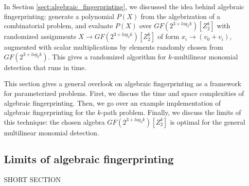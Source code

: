 In Section \ref{sect:algebraic_fingerprinting}, we discussed the idea behind 
algebraic fingerprinting: generate a polynomial $P(X)$ from the algebrization of 
a combinatorial problem, and evaluate $P(X)$ over $GF(2^{3+log_2k})[Z_2^k]$ with 
randomized assignments $X \to GF(2^{3+log_2k})[Z_2^k]$ of form 
$x_i \to (v_0 + v_i)$, augmented with scalar multiplications 
by elements randomly chosen from $GF(2^{3+log_2k})$. This gives a  
randomized algorithm for $k$-multilinear monomial detection that runs in  time.

This section gives a general overlook on algebraic fingerprinting as a 
framework for parameterized problems. First, we discuss the 
{time and space complexities} of algebraic fingerprinting. Then, 
we go over an example implementation 
of algebraic fingerprinting for the $k$-path problem. 
Finally, we discuss the limits of 
this technique: the chosen algebra $GF(2^{3+log_2k})[Z_2^k]$ 
is optimal for the general multilinear monomial detection.









\subsection{Limits of algebraic fingerprinting}
\label{sect:limits}

SHORT SECTION


